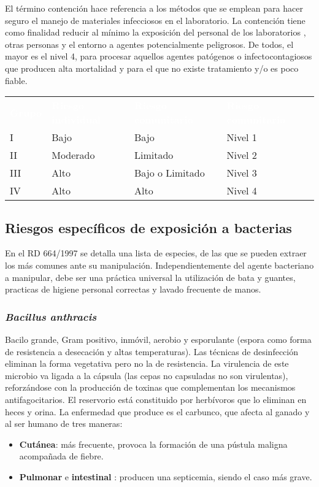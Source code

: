 El término contención hace referencia a los métodos que se emplean para hacer seguro el manejo de materiales infecciosos en el laboratorio. La contención tiene como finalidad reducir al mínimo la exposición del personal de los laboratorios , otras personas y el entorno a agentes potencialmente peligrosos. De todos, el mayor es el nivel 4, para procesar aquellos agentes patógenos o infectocontagiosos que producen alta mortalidad y para el que no existe tratamiento y/o es poco fiable.

\begin{tabular}{N{3.5cm}N{3.5cm}N{3.5cm}N{3.5cm}}
    \textcolor{white}{\textbf{Grupo}}&\textcolor{white}{\textbf{Riesgo individual}}&\textcolor{white}{\textbf{Riesgo comunitario}}&\textcolor{white}{\textbf{Riesgo comunitario}}\\
    I&Bajo&Bajo &Nivel 1\\
    II&Moderado&Limitado&Nivel 2\\
    III&Alto&Bajo o Limitado&Nivel 3\\
    IV&Alto&Alto&Nivel 4\\
    \hline
\end{tabular}
\subsection{Riesgos específicos de exposición a bacterias}
En el RD 664/1997 se detalla una lista de especies, de las que se pueden extraer los más comunes ante su manipulación. Independientemente del agente bacteriano a manipular, debe ser una práctica universal la utilización de bata y guantes, practicas de higiene personal correctas y lavado frecuente de manos.
\subsubsection{\textit{Bacillus anthracis}}
Bacilo grande, Gram positivo, inmóvil, aerobio y esporulante (espora como forma de resistencia a desecación y altas temperaturas). Las técnicas de desinfección eliminan la forma vegetativa pero no la de resistencia. La virulencia de este microbio va ligada a la cápsula (las cepas no capsuladas no son virulentas), reforzándose con la producción de toxinas que complementan los mecanismos antifagocitarios. El reservorio está constituido por herbívoros que lo eliminan en heces y orina. La enfermedad que produce es el carbunco, que afecta al ganado y al ser humano de tres maneras:
\begin{itemize}[itemsep=0pt,parsep=0pt,topsep=0pt,partopsep=0pt]
    \item \textbf{Cutánea}: más frecuente, provoca la formación de una pústula maligna acompañada de fiebre.
    \item\textbf{Pulmonar} e \textbf{intestinal} : producen una septicemia, siendo el caso más grave.
\end{itemize}


